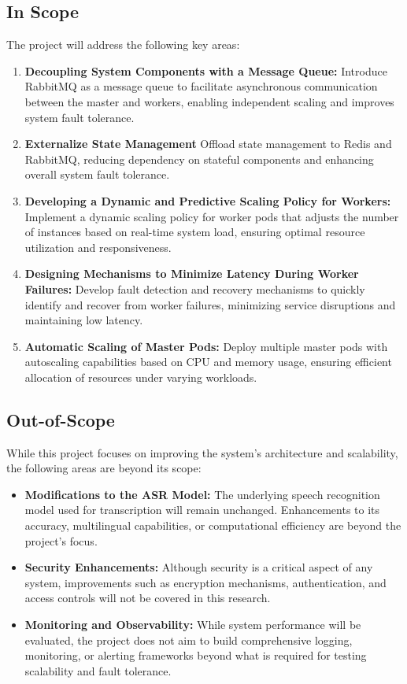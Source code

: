 \subsection{In Scope}
The project will address the following key areas:
\begin{enumerate}
    \item \textbf{Decoupling System Components with a Message Queue:} Introduce RabbitMQ as a message queue to facilitate asynchronous communication between the master and workers, enabling independent scaling and improves system fault tolerance.
    \item \textbf{Externalize State Management} Offload state management to Redis and RabbitMQ, reducing dependency on stateful components and enhancing overall system fault tolerance.
    \item \textbf{Developing a Dynamic and Predictive Scaling Policy for Workers:} Implement a dynamic scaling policy for worker pods that adjusts the number of instances based on real-time system load, ensuring optimal resource utilization and responsiveness.
    \item \textbf{Designing Mechanisms to Minimize Latency During Worker Failures:} Develop fault detection and recovery mechanisms to quickly identify and recover from worker failures, minimizing service disruptions and maintaining low latency.
    \item \textbf{Automatic Scaling of Master Pods:} Deploy multiple master pods with autoscaling capabilities based on CPU and memory usage, ensuring efficient allocation of resources under varying workloads.
\end{enumerate}

\subsection{Out-of-Scope}
While this project focuses on improving the system’s architecture and scalability, the following areas are beyond its scope:
\begin{itemize}
    \item \textbf{Modifications to the ASR Model:} The underlying speech recognition model used for transcription will remain unchanged. Enhancements to its accuracy, multilingual capabilities, or computational efficiency are beyond the project's focus.
    \item \textbf{Security Enhancements:} Although security is a critical aspect of any system, improvements such as encryption mechanisms, authentication, and access controls will not be covered in this research.
    \item \textbf{Monitoring and Observability:} While system performance will be evaluated, the project does not aim to build comprehensive logging, monitoring, or alerting frameworks beyond what is required for testing scalability and fault tolerance.
\end{itemize}

